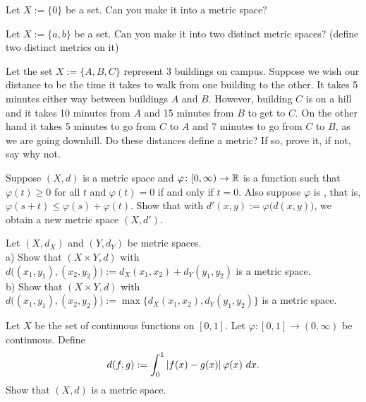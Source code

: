 \begin{exercise}
Let $X := \{ 0 \}$ be a set.  Can you make it into a metric space?
\end{exercise}

\begin{exercise}
Let $X := \{ a, b \}$ be a set.  Can you make it into two distinct metric
spaces?  (define two distinct metrics on it)
\end{exercise}

\begin{exercise}
Let the set $X := \{ A, B, C \}$ represent 3 buildings on campus.  Suppose we
wish our distance to be the time it takes to walk from one building to
the other.
It takes 5 minutes either way between buildings $A$ and $B$.  However,
building $C$ is on a hill and it takes 10 minutes from $A$ and 15 minutes
from $B$ to get to $C$.  On the other hand it takes 5 minutes to go
from $C$ to $A$ and 7 minutes to go from $C$ to $B$, as we are going
downhill.  Do these distances define a metric?  If so, prove it, if not, say
why not.
\end{exercise}

\begin{exercise}
Suppose $(X,d)$ is a metric space and
$\varphi \colon [0,\infty) \to {\mathbb{R}}$ is
a function such that 
$\varphi(t) \geq 0$ for all $t$ and $\varphi(t) = 0$ if and only if
$t=0$.  Also suppose $\varphi$ is \emph{},
that is, $\varphi(s+t) \leq \varphi(s)+\varphi(t)$.
Show that with $d'(x,y) := \varphi\bigl(d(x,y)\bigr)$, we obtain a new
metric space $(X,d')$.
\end{exercise}

\begin{exercise} \label{exercise:mscross}
Let $(X,d_X)$ and $(Y,d_Y)$ be metric spaces.\\
a) Show that $(X \times Y,d)$ with
$d\bigl( (x_1,y_1), (x_2,y_2) \bigr) := d_X(x_1,x_2) + d_Y(y_1,y_2)$ is
a metric space. \\
b) Show that $(X \times Y,d)$ with
$d\bigl( (x_1,y_1), (x_2,y_2) \bigr) := \max \{ d_X(x_1,x_2) , d_Y(y_1,y_2) \}$ is
a metric space.
\end{exercise}

\begin{exercise}
Let $X$ be the set of continuous functions on $[0,1]$.  Let $\varphi \colon
[0,1] \to (0,\infty)$ be continuous.  Define
\begin{equation*}
d(f,g) := \int_0^1 \left\lvert {f(x)-g(x)} \right\rvert\varphi(x)~dx .
\end{equation*}
Show that $(X,d)$ is a metric space.
\end{exercise}

